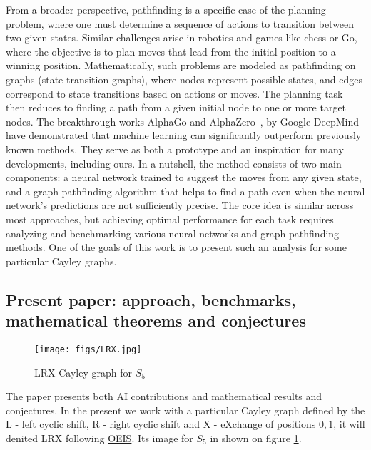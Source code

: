 \documentclass[atmp]{ipart_v1}
\numberwithin{equation}{section}
\theoremstyle{plain}%
\begin{document}
From a broader perspective, pathfinding is a specific case of the planning problem, where one must determine a sequence of actions to transition between two given states. Similar challenges arise in robotics and games like chess or Go, where the objective is to plan moves that lead from the initial position to a winning position. Mathematically, such problems are modeled as pathfinding on graphs (state transition graphs), where nodes represent possible states, and edges correspond to state transitions based on actions or moves. The planning task then reduces to finding a path from a given initial node to one or more target nodes. The breakthrough works AlphaGo and AlphaZero~\cite{silver2016mastering}, \cite{silver2017mastering} by Google DeepMind have demonstrated that machine learning can significantly outperform previously known methods. They serve as both a prototype and an inspiration for many developments, including ours. In a nutshell, the method consists of two main components: a neural network trained to suggest the  moves from any given state, and a graph pathfinding algorithm that helps to find a path even when the neural network's predictions are not sufficiently precise. The core idea is similar across most approaches, but achieving optimal performance for each task requires analyzing and benchmarking various neural networks and graph pathfinding methods. One of the goals of this work is to present such an analysis for some particular Cayley graphs.

\subsection{Present paper: approach, benchmarks, mathematical theorems and conjectures}

\begin{figure}[h!]
   \centering
   \texttt{[image: figs/LRX.jpg]}
   \caption{LRX Cayley graph for $S_5$}\label{fig:LRX1}
\end{figure}


The paper presents both AI contributions and  mathematical results and conjectures. In the present we work with a particular Cayley graph defined by the L - left cyclic shift, R - right cyclic shift and X - eXchange of positions $0,1$, it will denited LRX following \href{https://oeis.org/A186783}{OEIS}. Its image for $S_5$ in shown on figure \ref{fig:LRX1}.
\end{document}
